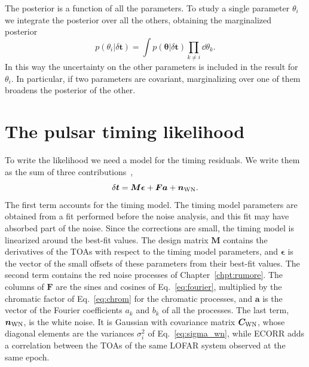 The posterior is a function of all the parameters. To study a single parameter
$\theta_i$ we integrate the posterior over all the others, obtaining the
marginalized posterior
\begin{equation}
    p(\theta_i|\delta\bm{t}) = \int p(\bm{\theta}|\delta\bm{t})
    \prod_{k\neq i}\dd\theta_k .
    \label{eq:marginal}
\end{equation}
In this way the uncertainty on the other parameters is included in the result
for $\theta_i$. In particular, if two parameters are covariant, marginalizing
over one of them broadens the posterior of the other.

\section{The pulsar timing likelihood} \label{sec:likelihood}

To write the likelihood we need a model for the timing residuals. We write
them as the sum of three contributions~\cite{Taylor2021},
\begin{equation}
    \delta\bm{t} = \bm{M}\bm{\epsilon} + \bm{F}\bm{a} + \bm{n}_{\rm WN}.
    \label{eq:modello_residui}
\end{equation}
The first term accounts for the timing model. The timing model parameters are
obtained from a fit performed before the noise analysis, and this fit may have
absorbed part of the noise. Since the corrections are small, the timing model
is linearized around the best-fit values. The design matrix $\bm{M}$ contains
the derivatives of the TOAs with respect to the timing model parameters, and
$\bm{\epsilon}$ is the vector of the small offsets of these parameters from
their best-fit values. The second term contains the red noise processes of
Chapter~\ref{chpt:rumore}. The columns of $\bm{F}$ are the sines and cosines of
Eq.~\eqref{eq:fourier}, multiplied by the chromatic factor of
Eq.~\eqref{eq:chrom} for the chromatic processes, and $\bm{a}$ is the vector of
the Fourier coefficients $a_k$ and $b_k$ of all the processes. The last term,
$\bm{n}_{\rm WN}$, is the white noise. It is Gaussian with covariance matrix
$\bm{C}_{\rm WN}$, whose diagonal elements are the variances $\sigma_i^2$ of
Eq.~\eqref{eq:sigma_wn}, while ECORR adds a correlation between the TOAs of
the same LOFAR system observed at the same epoch.

